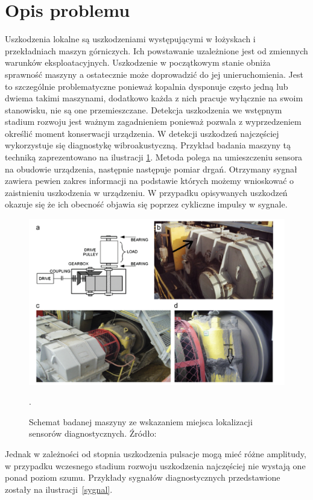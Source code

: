 \documentclass[inzynierska]{pwr_wmat_praca_dyplomowa}
\theoremstyle{plain}
\numberwithin{theorem}{chapter}
\theoremstyle{definition}
\numberwithin{theorem}{chapter}
\begin{document}
\section{Opis problemu}
Uszkodzenia lokalne są uszkodzeniami występującymi w łożyskach i przekładniach maszyn górniczych. Ich powstawanie uzależnione jest od zmiennych warunków eksploatacyjnych\cite{adaptacyjne}. Uszkodzenie w początkowym stanie obniża sprawność maszyny a ostatecznie może doprowadzić do jej unieruchomienia. Jest to szczególnie problematyczne ponieważ kopalnia dysponuje często jedną lub dwiema takimi maszynami, dodatkowo każda z nich pracuje wyłącznie na swoim stanowisku, nie są one przemieszczane.
 Detekcja uszkodzenia we wstępnym stadium rozwoju jest ważnym zagadnieniem ponieważ pozwala z wyprzedzeniem określić moment konserwacji urządzenia. W detekcji uszkodzeń najczęściej wykorzystuje się diagnostykę wibroakustyczną. Przykład badania maszyny tą techniką zaprezentowano na ilustracji \ref{sensory}. Metoda polega na umieszczeniu sensora na obudowie urządzenia, następnie następuje pomiar drgań. Otrzymany sygnał zawiera pewien zakres informacji na podstawie których możemy wnioskować o zaistnieniu uszkodzenia w urządzeniu. W przypadku opisywanych uszkodzeń okazuje się że ich obecność objawia się poprzez cykliczne impulsy w sygnale.
\begin{figure}[ht]

\centering
                     
\includegraphics[scale=0.5]{images/sensors.png}
\caption{Schemat badanej maszyny ze wskazaniem miejsca lokalizacji sensorów diagnostycznych. Źródło: \cite{wylomanska}}.
\label{sensory}
\end{figure}
Jednak w zależności od stopnia uszkodzenia pulsacje mogą mieć różne amplitudy, w przypadku wczesnego stadium rozwoju uszkodzenia najczęściej nie wystają one ponad poziom szumu. Przykłady sygnałów diagnostycznych przedstawione zostały na ilustracji~\ref{sygnal}.
\end{document}
